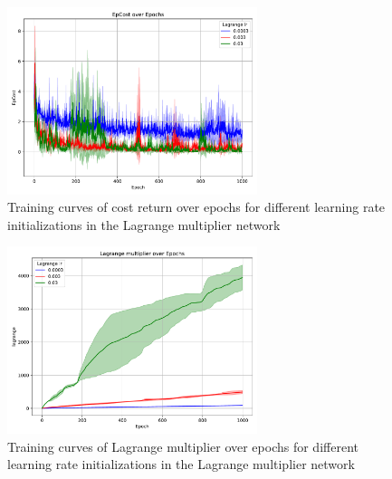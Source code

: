 \begin{figure}[h]
  \centering
  \includegraphics[width=0.65\textwidth]{imgs/chap4/lagrange_lr/cost.pdf}
  \caption{Training curves of cost return over epochs for different learning rate initializations in the Lagrange multiplier network}
  \label{chap4:fig:lagrange_lr_cost}
\end{figure}

\begin{figure}[h]
  \centering
  \includegraphics[width=0.65\textwidth]{imgs/chap4/lagrange_lr/lagrange.pdf}
  \caption{Training curves of Lagrange multiplier over epochs for different learning rate initializations in the Lagrange multiplier network}
  \label{chap4:fig:lagrange_lr_lagrange}
\end{figure}

\clearpage


